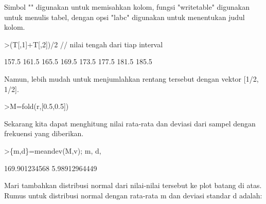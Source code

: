 \documentclass[12pt,arial,letterpaper]{book}
\begin{document}
\begin{eulercomment}
\begin{eulercomment}
\begin{eulercomment}
\begin{eulercomment}
\begin{eulercomment}
\begin{eulercomment}
\begin{eulercomment}
\begin{eulercomment}
\begin{eulercomment}
\begin{eulercomment}
\begin{eulercomment}
\begin{eulercomment}
\begin{eulercomment}
\begin{eulercomment}
\begin{eulercomment}
\begin{eulercomment}
\begin{eulercomment}
\begin{eulercomment}
\begin{eulercomment}
\begin{eulercomment}
\begin{eulercomment}
\begin{eulercomment}
\begin{eulercomment}
\begin{eulercomment}
\begin{eulercomment}
\begin{eulercomment}
\begin{eulercomment}
\begin{eulercomment}
\begin{eulercomment}
\begin{eulercomment}
\begin{eulercomment}
\begin{eulercomment}
\begin{eulercomment}
Simbol "\textbar{}" digunakan untuk memisahkan kolom, fungsi "writetable"
digunakan untuk menulis tabel, dengan opsi "labc" digunakan untuk
menentukan judul kolom.
\end{eulercomment}
\begin{eulerprompt}
>(T[,1]+T[,2])/2 // nilai tengah dari tiap interval
\end{eulerprompt}
\begin{euleroutput}
          157.5 
          161.5 
          165.5 
          169.5 
          173.5 
          177.5 
          181.5 
          185.5 
\end{euleroutput}
\begin{eulercomment}
Namun, lebih mudah untuk menjumlahkan rentang tersebut dengan vektor
[1/2, 1/2].
\end{eulercomment}
\begin{eulerprompt}
>M=fold(r,[0.5,0.5])
\end{eulerprompt}
\begin{euleroutput}
  [157.5,  161.5,  165.5,  169.5,  173.5,  177.5,  181.5,  185.5]
\end{euleroutput}
\begin{eulercomment}
Sekarang kita dapat menghitung nilai rata-rata dan deviasi dari sampel
dengan frekuensi yang diberikan.
\end{eulercomment}
\begin{eulerprompt}
>\{m,d\}=meandev(M,v); m, d,
\end{eulerprompt}
\begin{euleroutput}
  169.901234568
  5.98912964449
\end{euleroutput}
\begin{eulercomment}
Mari tambahkan distribusi normal dari nilai-nilai tersebut ke plot
batang di atas. Rumus untuk distribusi normal dengan rata-rata m dan
deviasi standar d adalah:


\end{eulercomment}
\end{eulercomment}
\end{eulercomment}
\end{eulercomment}
\end{eulercomment}
\end{eulercomment}
\end{eulercomment}
\end{eulercomment}
\end{eulercomment}
\end{eulercomment}
\end{eulercomment}
\end{eulercomment}
\end{eulercomment}
\end{eulercomment}
\end{eulercomment}
\end{eulercomment}
\end{eulercomment}
\end{eulercomment}
\end{eulercomment}
\end{eulercomment}
\end{eulercomment}
\end{eulercomment}
\end{eulercomment}
\end{eulercomment}
\end{eulercomment}
\end{eulercomment}
\end{eulercomment}
\end{eulercomment}
\end{eulercomment}
\end{eulercomment}
\end{eulercomment}
\end{eulercomment}
\end{eulercomment}
\end{document}
